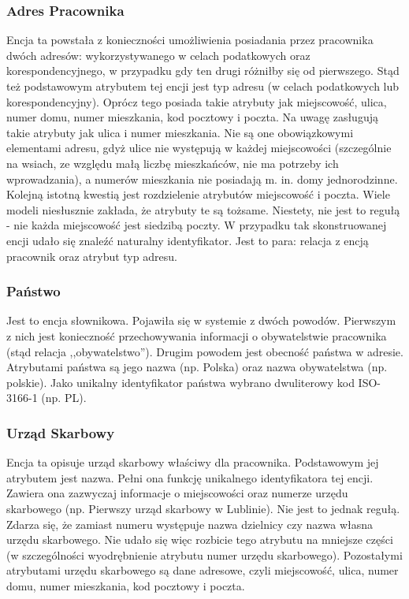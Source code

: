 \subsubsection{Adres Pracownika}
Encja ta powstała z konieczności umożliwienia posiadania przez pracownika dwóch adresów: wykorzystywanego w celach podatkowych oraz korespondencyjnego, w przypadku gdy ten drugi różniłby się od pierwszego. Stąd też podstawowym atrybutem tej encji jest typ adresu (w celach podatkowych lub korespondencyjny). Oprócz tego posiada takie atrybuty jak miejscowość, ulica, numer domu, numer mieszkania, kod pocztowy i poczta. Na uwagę zasługują takie atrybuty jak ulica i numer mieszkania. Nie są one obowiązkowymi elementami adresu, gdyż ulice nie występują w każdej miejscowości (szczególnie na wsiach, ze względu małą liczbę mieszkańców, nie ma potrzeby ich wprowadzania), a numerów mieszkania nie posiadają m. in. domy jednorodzinne. Kolejną istotną kwestią jest rozdzielenie atrybutów miejscowość i poczta. Wiele modeli niesłusznie zakłada, że atrybuty te są tożsame. Niestety, nie jest to regułą - nie każda miejscowość jest siedzibą poczty.
W przypadku tak skonstruowanej encji udało się znaleźć naturalny identyfikator. Jest to para: relacja z encją pracownik oraz atrybut typ adresu.

\subsubsection{Państwo}
Jest to encja słownikowa. Pojawiła się w systemie z dwóch powodów. Pierwszym z nich jest konieczność przechowywania informacji o obywatelstwie pracownika  (stąd relacja ,,obywatelstwo''). Drugim powodem jest obecność państwa w adresie. Atrybutami państwa są jego nazwa (np. Polska) oraz nazwa obywatelstwa (np. polskie). Jako unikalny identyfikator państwa wybrano dwuliterowy kod ISO-3166-1\cite{panstwa} (np. PL).

\subsubsection{Urząd Skarbowy}
Encja ta opisuje urząd skarbowy właściwy dla pracownika. Podstawowym jej atrybutem jest nazwa. Pełni ona funkcję unikalnego identyfikatora tej encji. Zawiera ona zazwyczaj informacje o miejscowości oraz numerze urzędu skarbowego (np. Pierwszy urząd skarbowy w Lublinie). Nie jest to jednak regułą. Zdarza się, że zamiast numeru występuje nazwa dzielnicy czy nazwa własna urzędu skarbowego. Nie udało się więc rozbicie tego atrybutu na mniejsze części (w szczególności wyodrębnienie atrybutu numer urzędu skarbowego). Pozostałymi atrybutami urzędu skarbowego są dane adresowe, czyli miejscowość, ulica, numer domu, numer mieszkania, kod pocztowy i poczta.

